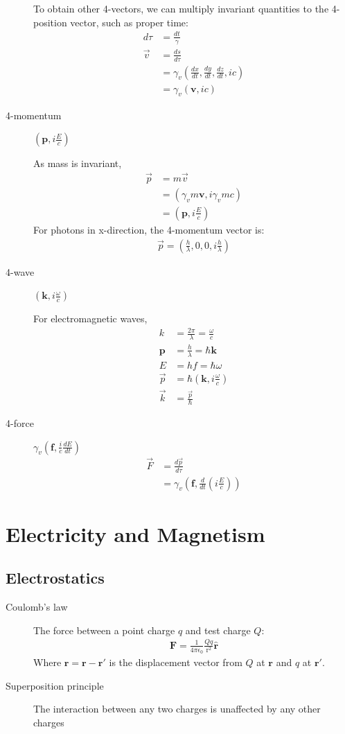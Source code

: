 \documentclass[11pt]{article}
\newcommand{\ve}[1]{
  \ensuremath{\bm{#1}}}	               %
\newcommand{\fve}[1]{
  \ensuremath{\vec{#1}}}               %
\newcommand{\dr}{
  \ensuremath{\text{r}}}               %
\newcommand{\dvr}{
  \ensuremath{\textbf{r}}}             %
\newcommand{\dvrhat}{
  \ensuremath{\ve{\hat{\dvr}}}}	       %
\begin{document}
\begin{multicols*}{3}
\begin{description}
To obtain other 4-vectors, we can multiply invariant quantities to the 4-position vector, such as proper time:
\begin{align*}
d\tau&=\frac{dt}{\gamma}\\
\fve{v}&=\frac{ds}{d\tau}\\
&=\gamma_v\left(\frac{dx}{dt},\frac{dy}{dt},\frac{dz}{dt},ic\right)\\
&=\gamma_v(\ve{v},ic)
\end{align*}
\item[4-momentum] $\left(\ve{p},i\frac{E}{c}\right)$

As mass is invariant, 
\begin{align*}
\fve{p}&=m\fve{v}\\
&=(\gamma_vm\ve{v},i\gamma_vmc)\\
&=\left(\ve{p},i\frac{E}{c}\right)
\end{align*}
For photons in x-direction, the 4-momentum vector is:
\begin{align*}
\fve{p}=\left(\frac{h}{\lambda},0,0,i\frac{h}{\lambda}\right)
\end{align*}
\item[4-wave] $\left(\ve{k},i\frac{\omega}{c}\right)$

For electromagnetic waves,
\begin{align*}
k&=\frac{2\pi}{\lambda}=\frac{\omega}{c}\\
\ve{p}&=\frac{h}{\lambda}=\hbar\ve{k}\\
E&=hf=\hbar\omega\\
\fve{p}&=\hbar\left(\ve{k},i\frac{\omega}{c}\right)\\
\fve{k}&=\frac{\fve{p}}{\hbar}
\end{align*}
\item[4-force] $\gamma_v\left(\ve{f},\frac{i}{c}\frac{dE}{dt}\right)$
\begin{align*}
\fve{F}&=\frac{d\fve{p}}{d\tau}\\
&=\gamma_v\left(\ve{f},\frac{d}{dt}\left(i\frac{E}{c}\right)\right)
\end{align*}
\end{description}

\section{Electricity and Magnetism}
\subsection{Electrostatics}
\begin{description}
\item[Coulomb's law] The force between a point charge $q$ and test charge $Q$:
\begin{align*}
\ve{F} =\frac{1}{4\pi\epsilon_0}\frac{Qq}{\dr^2}\dvrhat
\end{align*}
Where $\dvr=\ve{r}-\ve{r'}$ is the displacement vector from $Q$ at $\ve{r}$ and $q$ at $\ve{r'}$.
\item[Superposition principle] The interaction between any two charges is unaffected by any other charges
\end{description}


\end{multicols*}
\end{document}
